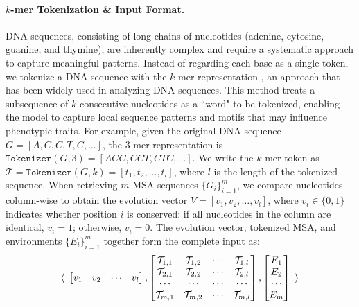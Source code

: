 \paragraph{$k$-mer Tokenization \& Input Format.}
DNA sequences, consisting of long chains of nucleotides (adenine, cytosine, guanine, and thymine), are inherently complex and require a systematic approach to capture meaningful patterns.
Instead of regarding each base as a single token, we tokenize a DNA sequence with the $k$-mer representation \cite{chor2009genomic}, an approach that has been widely used in analyzing DNA sequences.
This method treats a subsequence of $k$ consecutive nucleotides as a ``word" to be tokenized, enabling the model to capture local sequence patterns and motifs that may influence phenotypic traits. For example, given the original DNA sequence $G=[A,C,C,T,C,...]$, the $3$-mer representation is $\texttt{Tokenizer}(G,3)=[ACC, CCT,CTC,...]$. 
We write the $k$-mer token as $\mathcal{T}=\texttt{Tokenizer}(G,k)=[t_1, t_2, ..., t_l]$, where $l$ is the length of the tokenized sequence. When retrieving $m$ MSA sequences $\{G_i\}_{i=1}^m$, we compare nucleotides column-wise to obtain the evolution vector $V = [v_1, v_2, \dots, v_l]$, where $v_i \in \{0,1\}$ indicates whether position $i$ is conserved: if all nucleotides in the column are identical, $v_i = 1$; otherwise, $v_i = 0$. The evolution vector, tokenized MSA, and environments $\{E_i\}_{i=1}^m$ together form the complete input as:
\begin{equation*}
\langle
    \begin{array}
    {c@{\, ,\,}c@{\, ,\,}c}
        \begin{bmatrix}
            v_1 & v_2 & \cdots & v_l
        \end{bmatrix} 
        &
        \begin{bmatrix}
            \mathcal{T}_{1,1} & \mathcal{T}_{1,2} & \cdots  &
            \mathcal{T}_{1,l}
            \\
            \mathcal{T}_{2,1} & \mathcal{T}_{2,2} & \cdots  &
            \mathcal{T}_{2,l}
            \\
            \cdots & \cdots & \cdots & \cdots 
            \\
            
            \mathcal{T}_{m,1} & \mathcal{T}_{m,2} & \cdots  &
            \mathcal{T}_{m,l}
            
        \end{bmatrix} 
        &
        \begin{bmatrix}
            E_{1} \\
            E_{2} \\
            \cdots  \\
            E_{m} 
        \end{bmatrix}
        
    \end{array}
\rangle
\end{equation*}
